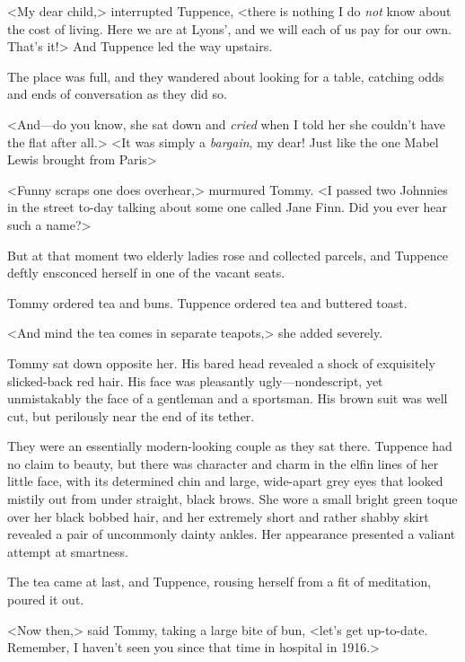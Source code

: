 <My dear child,> interrupted Tuppence, <there is nothing I do \emph{not} know about the cost of living. Here we are at Lyons', and we will each of us pay for our own. That's it!> And Tuppence led the way upstairs.

The place was full, and they wandered about looking for a table, catching odds and ends of conversation as they did so.

<And—do you know, she sat down and \emph{cried} when I told her she couldn't have the flat after all.> <It was simply a \emph{bargain}, my dear! Just like the one Mabel Lewis brought from Paris\longdash>

<Funny scraps one does overhear,> murmured Tommy. <I passed two Johnnies in the street to-day talking about some one called Jane Finn. Did you ever hear such a name?>

But at that moment two elderly ladies rose and collected parcels, and Tuppence deftly ensconced herself in one of the vacant seats.

Tommy ordered tea and buns. Tuppence ordered tea and buttered toast.

<And mind the tea comes in separate teapots,> she added severely.

Tommy sat down opposite her. His bared head revealed a shock of exquisitely slicked-back red hair. His face was pleasantly ugly—nondescript, yet unmistakably the face of a gentleman and a sportsman. His brown suit was well cut, but perilously near the end of its tether.

They were an essentially modern-looking couple as they sat there. Tuppence had no claim to beauty, but there was character and charm in the elfin lines of her little face, with its determined chin and large, wide-apart grey eyes that looked mistily out from under straight, black brows. She wore a small bright green toque over her black bobbed hair, and her extremely short and rather shabby skirt revealed a pair of uncommonly dainty ankles. Her appearance presented a valiant attempt at smartness.

The tea came at last, and Tuppence, rousing herself from a fit of meditation, poured it out.

<Now then,> said Tommy, taking a large bite of bun, <let's get up-to-date. Remember, I haven't seen you since that time in hospital in 1916.>

